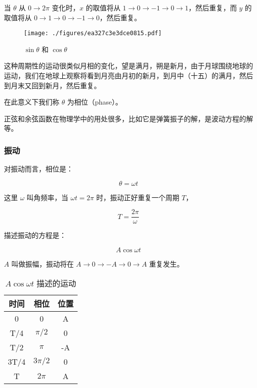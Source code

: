 当 $\theta$ 从 $0 \to 2\pi$ 变化时，$x$ 的取值将从 $1 \to 0 \to -1 \to 0 \to 1$，然后重复，而 $y$ 的取值将从 $0 \to 1 \to 0 \to -1 \to 0$，然后重复。

\begin{figure}[ht]
\centering
\texttt{[image: ./figures/ea327c3e3dce0815.pdf]}
\caption{$\sin\theta$ 和 $\cos\theta$} \label{fig_AtomId_7}
\end{figure}


这种周期性的运动很类似月相的变化，望是满月，朔是新月，由于月球围绕地球的运动，我们在地球上观察将看到月亮由月初的新月，到月中（十五）的满月，然后到月末又回到新月，然后重复。

在此意义下我们称 $\theta$ 为相位（phase）。

正弦和余弦函数在物理学中的用处很多，比如它是弹簧振子的解，是波动方程的解等。

\subsubsection{振动}

对振动而言，相位是：

\begin{equation}
\theta = \omega t 
\end{equation}

这里 $\omega$ 叫角频率，当 $\omega t = 2 \pi$ 时，振动正好重复一个周期 $T$，

\begin{equation}
T = \frac{2 \pi}{\omega}
\end{equation}

描述振动的方程是：

\begin{equation}
A \cos \omega t
\end{equation}

$A$ 叫做振幅，振动将在 $A \to 0 \to -A \to 0 \to A$ 重复发生。

\begin{table}[ht]
\centering
\caption{$A \cos \omega t$ 描述的运动}\label{tab_AtomId_3}
\begin{tabular}{|c|c|c|}
\hline
时间 & 相位 &  位置 \\
\hline
0 & 0 & A \\
\hline
T/4 & $\pi /2 $ & 0 \\
\hline
T/2 & $\pi$ & -A \\
\hline
3T/4 & $3 \pi /2  $ &  0 \\
\hline
T &  $2\pi$  & A \\
\hline
\end{tabular}
\end{table}


